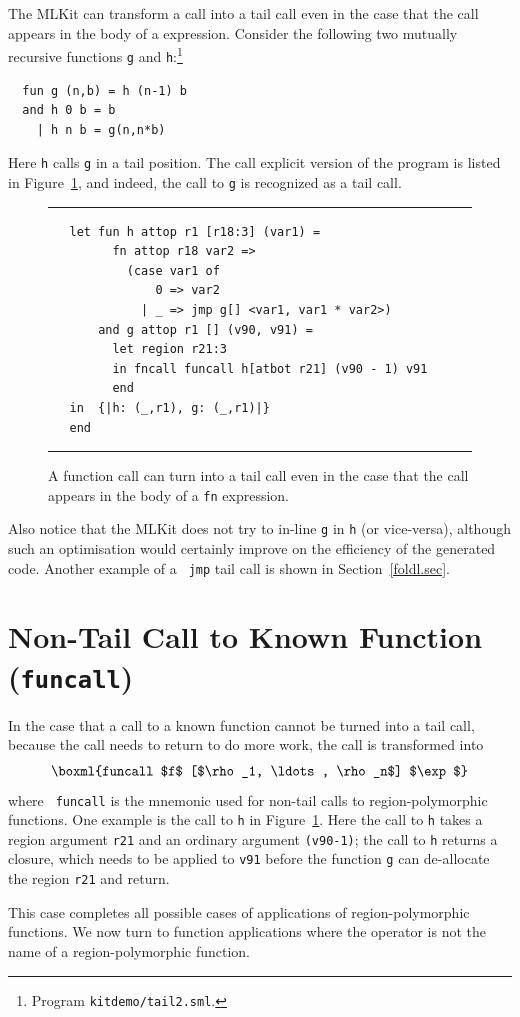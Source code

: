 \documentclass[12pt]{book}
\begin{document}
The MLKit can transform a call into a  tail call even in the
case that the call appears in the body of a  expression.
Consider the following two mutually recursive functions {\tt g} and
{\tt h}:\footnote{Program {\tt kitdemo/tail2.sml}.}
\begin{verbatim}
  fun g (n,b) = h (n-1) b
  and h 0 b = b
    | h n b = g(n,n*b)
\end{verbatim}
Here {\tt h} calls {\tt g} in a tail position. The call explicit
version of the program is listed in Figure~\ref{tail2.fig}, and
indeed, the call to {\tt g} is recognized as a tail call.
\begin{figure}
\hrule \medskip
\begin{verbatim}
   let fun h attop r1 [r18:3] (var1) =
         fn attop r18 var2 =>
           (case var1 of
               0 => var2
             | _ => jmp g[] <var1, var1 * var2>)
       and g attop r1 [] (v90, v91) =
         let region r21:3
         in fncall funcall h[atbot r21] (v90 - 1) v91
         end
   in  {|h: (_,r1), g: (_,r1)|}
   end
\end{verbatim}
\caption{A function call can turn into a tail call even
  in the case that the call appears in the body of a {\tt fn} expression.}
\medskip \hrule
\label{tail2.fig}
\end{figure}
Also notice that the MLKit does not try to in-line {\tt g} in {\tt h}
(or vice-versa), although such an optimisation would certainly improve
on the efficiency of the generated code. Another example of a {\tt
  jmp} tail call is shown in Section~\ref{foldl.sec}.

\section{Non-Tail Call to Known Function (\texttt{funcall})}
In the case that a call to a known function cannot be turned into a
tail call, because the call needs to return to do more work, the call
is transformed into
$$\boxml{funcall $f$ [$\rho_1, \ldots, \rho_n$] $\exp$}$$
where {\tt
  funcall} is the mnemonic used for non-tail calls to
region-polymorphic functions. One example is the call to {\tt h} in
Figure~\ref{tail2.fig}. Here the call to {\tt h} takes a region
argument {\tt r21} and an ordinary argument {\tt (v90-1)}; the call to
{\tt h} returns a closure, which needs to be applied to {\tt v91}
before the function {\tt g} can de-allocate the region {\tt r21} and
return.

This case completes all possible cases of applications of
region-polymorphic functions. We now turn to function applications
where the operator is not the name of a region-polymorphic function.
\end{document}
